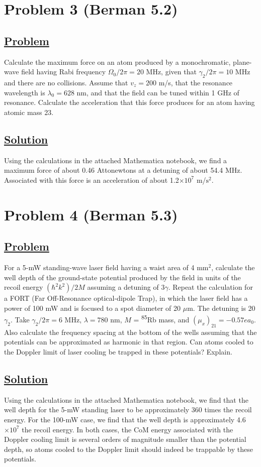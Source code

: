 \documentclass[12pt]{article}
\begin{document}
\section*{Problem 3 (Berman 5.2)}
\subsection*{\small\underline{Problem}}
Calculate the maximum force on an atom produced by a monochromatic, plane-wave field having Rabi frequency $\Omega_0/2\pi = 2   0$ MHz, given that $\gamma_2/2\pi = 10$ MHz and there are no collisions.
Assume that $v_z = 200$ m/s, that the resonance wavelength is $\lambda_0 = 628$ nm, and that the field can be tuned within 1 GHz of resonance.
Calculate the acceleration that this force produces for an atom having atomic mass 23.

\subsection*{\small\underline{Solution}}
Using the calculations in the attached Mathematica notebook, we find a maximum force of about 0.46 Attonewtons at a detuning of about 54.4 MHz.
Associated with this force is an acceleration of about 1.2$\times10^7$ m/$\text{s}^2$.


\section*{Problem 4 (Berman 5.3)}
\subsection*{\small\underline{Problem}}
For a 5-mW standing-wave laser field having a waist area of 4 $\text{mm}^2$, calculate the well depth of the ground-state potential produced by the field in units of the recoil energy $(\hbar^2k^2)/2M$ assuming a detuning of $3\gamma$.
Repeat the calculation for a FORT (Far Off-Resonance optical-dipole Trap), in which the laser field has a power of 100 mW and is focused to a spot diameter of 20 $\mu$m.
The detuning is 20$\gamma_2$. Take $\gamma_2/2\pi = 6$ MHz, $\lambda = 780$ nm, $M$ = \textsuperscript{85}Rb mass, and $\left(\mu_x\right)_{21} = -0.57ea_0$.
Also calculate the frequency spacing at the bottom of the wells assuming that the potentials can be approximated as harmonic in that region.
Can atoms cooled to the Doppler limit of laser cooling be trapped in these potentials? Explain.

\subsection*{\small\underline{Solution}}
Using the calculations in the attached Mathematica notebook, we find that the well depth for the 5-mW standing laser to be approximately 360 times the recoil energy.
For the 100-mW case, we find that the well depth is approximately 4.6$\times 10^7$ the recoil energy.
In both cases, the CoM energy associated with the Doppler cooling limit is several orders of magnitude smaller than the potential depth, so atoms cooled to the Doppler limit should indeed be trappable by these potentials.



\end{document}
